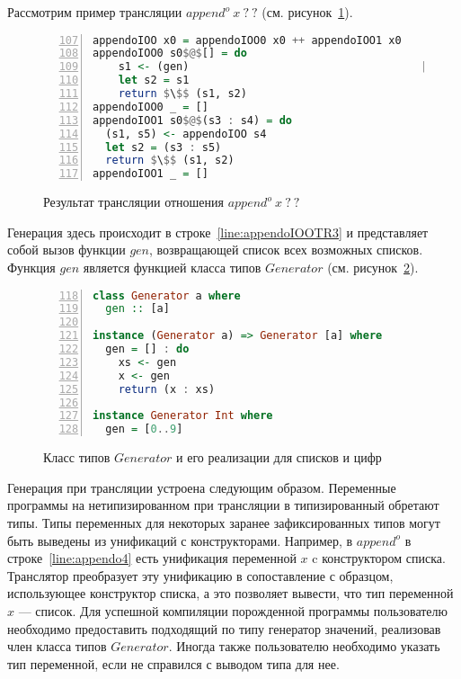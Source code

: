 Рассмотрим пример трансляции $append^o \ x \ ? \ ?$ (см. рисунок~\ref{lst:appendoIOOTR}).

\begin{figure}[h!]
  \begin{center}
  \begin{minipage}{0.62\textwidth}
  \begin{lstlisting}[language=Haskell, frame=single, numbers=left,numberstyle=\small, firstnumber=107, escapechar=|]
appendoIOO x0 = appendoIOO0 x0 ++ appendoIOO1 x0
appendoIOO0 s0$@$[] = do
    s1 <- (gen)                                    |\label{line:appendoIOOTR3}|
    let s2 = s1                                    
    return $\$$ (s1, s2)
appendoIOO0 _ = []
appendoIOO1 s0$@$(s3 : s4) = do
  (s1, s5) <- appendoIOO s4
  let s2 = (s3 : s5)
  return $\$$ (s1, s2)
appendoIOO1 _ = []
    \end{lstlisting}
  \end{minipage}
  \end{center}
  \caption{Результат трансляции отношения $append^o \ x \ ? \ ?$}
  \label{lst:appendoIOOTR}
\end{figure}

Генерация здесь происходит в строке~\ref{line:appendoIOOTR3} и представляет собой вызов функции $gen$, возвращающей список всех возможных списков.
Функция $gen$ является функцией класса типов $Generator$ (см. рисунок~\ref{lst:generator}).

\begin{figure}[h!]
  \begin{center}
  \begin{minipage}{0.6\textwidth}
  \begin{lstlisting}[language=Haskell, frame=single, numbers=left,numberstyle=\small, firstnumber=118, escapechar=|]
class Generator a where
  gen :: [a]
        
instance (Generator a) => Generator [a] where
  gen = [] : do
    xs <- gen
    x <- gen
    return (x : xs)

instance Generator Int where
  gen = [0..9]
    \end{lstlisting}
  \end{minipage}
  \end{center}
  \caption{Класс типов $Generator$ и его реализации для списков и цифр}
  \label{lst:generator}
\end{figure}

Генерация при трансляции устроена следующим образом.
Переменные программы на нетипизированном \miniKanren{} при трансляции в типизированный \haskell{} обретают типы.
Типы переменных для некоторых заранее зафиксированных типов могут быть выведены из унификаций с конструкторами. 
Например, в $append^o$ в строке~\ref{line:appendo4} есть унификация переменной $x$ c конструктором списка. 
Транслятор преобразует эту унификацию в сопоставление с образцом, использующее конструктор списка, а это позволяет \haskell{} вывести, что тип переменной $x$ --- список.
Для успешной компиляции порожденной программы пользователю необходимо предоставить подходящий по типу генератор значений, реализовав член класса типов $Generator$.
Иногда также пользователю необходимо указать тип переменной, если \haskell{} не справился с выводом типа для нее.

